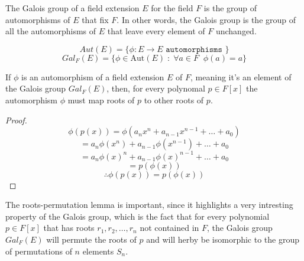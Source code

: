 \begin{definition}
    The Galois group of a field extension $E$ for the field $F$ is the group of
    automorphisms of $E$ that fix $F$. In other words, the Galois group is the
    group of all the automorphisms of $E$ that leave every element of $F$ unchanged.

    $$ Aut(E) = \{ \phi : E \rightarrow E \texttt{ automorphisms } \} $$
    $$ Gal_{F}(E) = \{ \phi \in \text{Aut}(E) \;:\; \forall a \in F \;\; \phi(a) = a \} $$
\end{definition} \vspace{0.2em}

\begin{lemma}
    If $\phi$ is an automorphism of a field extension $E$ of $F$, meaning it's an element 
    of the Galois group $Gal_{F}(E)$, then, for every polynomal $p \in F[x]$ the automorphism 
    $\phi$ must map roots of $p$ to other roots of $p$. 
\end{lemma}
\begin{proof}
    $$ \phi(p(x)) = \phi(a_nx^n + a_{n-1}x^{n-1} + \dots + a_0) $$
    $$ = a_n \phi(x^n) + a_{n-1} \phi(x^{n-1}) + \dots + a_0 $$
    $$ = a_n \phi(x)^n + a_{n-1} \phi(x)^{n-1} + \dots + a_0 $$
    $$ = p(\phi(x)) $$
    $$ \therefore \phi(p(x)) = p(\phi(x)) $$
\end{proof}   

The roots-permutation lemma is important, since it highlights a very intresting property of the
Galois group, which is the fact that for every polynomial $p \in F[x]$ that has roots 
$r_1, r_2, \dots, r_n$ not contained in $F$, the Galois group $Gal_{F}(E)$ will permute 
the roots of $p$ and will herby be isomorphic to the group of permutations of $n$ elements $S_n$.

